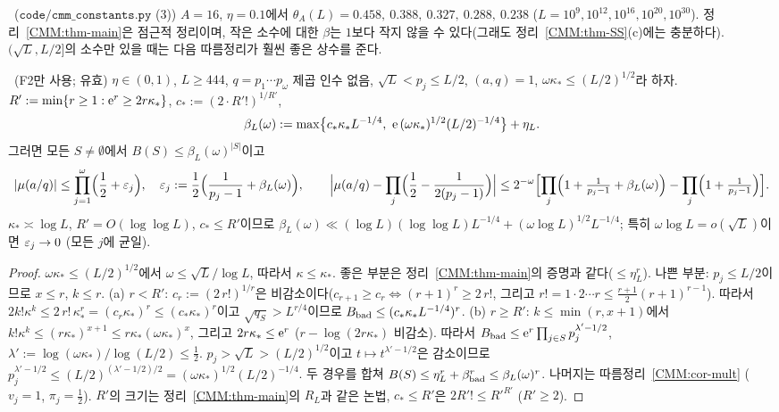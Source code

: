 \begin{remark}[상수의 크기]\label{CMM:rem-size}
\NUMERIC\ ($\texttt{code/cmm\_constants.py}$ (3)) $A=16$, $\eta=0.1$에서 $\theta_A(L)=0.458,\ 0.388,\ 0.327,\ 0.288,\ 0.238$
($L=10^9,10^{12},10^{16},10^{20},10^{30}$). 정리~\ref{CMM:thm-main}은 점근적 정리이며, 작은 소수에 대한
$\beta$는 $1$보다 작지 않을 수 있다(그래도 정리~\ref{CMM:thm-SS}(c)에는 충분하다). $(\sqrt L,L/2]$의 소수만 있을 때는
다음 따름정리가 훨씬 좋은 상수를 준다.
\end{remark}

\begin{corollary}[{$(\sqrt L,L/2]$의 소수: 유효한 곱셈적 상계}]\label{CMM:cor-large}
\PROVED\ (F2만 사용; 유효) $\eta\in(0,1)$, $L\ge444$, $q=p_1\cdots p_\omega$ 제곱 인수 없음, $\sqrt L<p_j\le L/2$, $(a,q)=1$,
$\omega\kappa_*\le(L/2)^{1/2}$라 하자. $R':=\min\{r\ge1:\mathrm{e}^r\ge2r\kappa_*\}$, $c_*:=(2\cdot R'!)^{1/R'}$,
\[
\beta_L(\omega):=\max\bigl\{c_*\kappa_*L^{-1/4},\ \e\,(\omega\kappa_*)^{1/2}(L/2)^{-1/4}\bigr\}+\eta_L .
\]
그러면 모든 $S\ne\emptyset$에서 $B(S)\le\beta_L(\omega)^{|S|}$이고
\[
|\mu(a/q)|\le\prod_{j=1}^{\omega}\Bigl(\frac12+\varepsilon_j\Bigr),\quad \varepsilon_j:=\frac12\Bigl(\frac1{p_j-1}+\beta_L(\omega)\Bigr),\qquad
\Bigl|\mu(a/q)-\prod_j\Bigl(\frac12-\frac1{2(p_j-1)}\Bigr)\Bigr|\le 2^{-\omega}\Bigl[\prod_j\Bigl(1+\tfrac1{p_j-1}+\beta_L(\omega)\Bigr)-\prod_j\Bigl(1+\tfrac1{p_j-1}\Bigr)\Bigr].
\]
$\kappa_*\asymp\log L$, $R'=O(\log\log L)$, $c_*\le R'$이므로 $\beta_L(\omega)\ll(\log L)(\log\log L)L^{-1/4}+(\omega\log L)^{1/2}L^{-1/4}$;
특히 $\omega\log L=o(\sqrt L)$이면 $\varepsilon_j\to0$ (모든 $j$에 균일).
\end{corollary}
\begin{proof}
$\omega\kappa_*\le(L/2)^{1/2}$에서 $\omega\le\sqrt L/\log L$, 따라서 $\kappa\le\kappa_*$. 좋은 부분은 정리~\ref{CMM:thm-main}의 증명과 같다($\le\eta_L^r$).
나쁜 부분: $p_j\le L/2$이므로 $x\le r$, $k\le r$.
(a) $r<R'$: $c_r:=(2\,r!)^{1/r}$은 비감소이다($c_{r+1}\ge c_r\iff(r+1)^r\ge2\,r!$, 그리고
$r!=1\cdot2\cdots r\le\frac{r+1}2(r+1)^{r-1}$). 따라서 $2k!\kappa^k\le2\,r!\,\kappa_*^r=(c_r\kappa_*)^r\le(c_*\kappa_*)^r$이고
$\sqrt{q_S}>L^{r/4}$이므로 $B_{\rm bad}\le(c_*\kappa_*L^{-1/4})^r$.
(b) $r\ge R'$: $k\le\min(r,x+1)$에서 $k!\kappa^k\le(r\kappa_*)^{x+1}\le r\kappa_*(\omega\kappa_*)^x$, 그리고 $2r\kappa_*\le\mathrm{e}^r$
($r-\log(2r\kappa_*)$ 비감소). 따라서 $B_{\rm bad}\le\mathrm{e}^r\prod_{j\in S}p_j^{\lambda'-1/2}$, $\lambda':=\log(\omega\kappa_*)/\log(L/2)\le\frac12$.
$p_j>\sqrt L>(L/2)^{1/2}$이고 $t\mapsto t^{\lambda'-1/2}$은 감소이므로 $p_j^{\lambda'-1/2}\le(L/2)^{(\lambda'-1/2)/2}=(\omega\kappa_*)^{1/2}(L/2)^{-1/4}$.
두 경우를 합쳐 $B(S)\le\eta_L^r+\beta_{\rm bad}^r\le\beta_L(\omega)^r$. 나머지는 따름정리~\ref{CMM:cor-mult} ($v_j=1$, $\pi_j=\frac12$).
$R'$의 크기는 정리~\ref{CMM:thm-main}의 $R_L$과 같은 논법, $c_*\le R'$은 $2R'!\le R'^{R'}$ ($R'\ge2$).
\end{proof}

